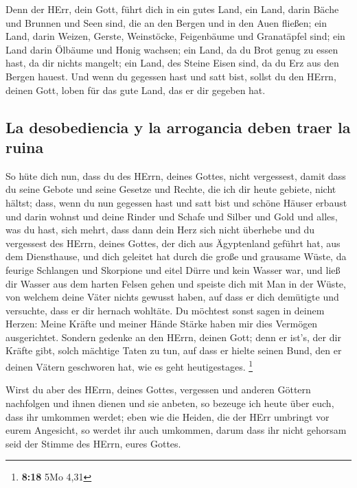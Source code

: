  Denn der HErr, dein Gott, führt dich in ein gutes Land,
ein Land, darin Bäche und Brunnen und Seen sind, die an den Bergen und
in den Auen fließen;  ein Land, darin Weizen, Gerste,
Weinstöcke, Feigenbäume und Granatäpfel sind; ein Land darin Ölbäume und
Honig wachsen;  ein Land, da du Brot genug zu essen hast,
da dir nichts mangelt; ein Land, des Steine Eisen sind, da du Erz aus
den Bergen hauest.  Und wenn du gegessen hast und satt
bist, sollst du den HErrn, deinen Gott, loben für das gute Land, das er
dir gegeben hat.

\hypertarget{la-desobediencia-y-la-arrogancia-deben-traer-la-ruina}{%
\subsection{La desobediencia y la arrogancia deben traer la
ruina}\label{la-desobediencia-y-la-arrogancia-deben-traer-la-ruina}}

 So hüte dich nun, dass du des HErrn, deines Gottes,
nicht vergessest, damit dass du seine Gebote und seine Gesetze und
Rechte, die ich dir heute gebiete, nicht hältst;  dass,
wenn du nun gegessen hast und satt bist und schöne Häuser erbaust und
darin wohnst  und deine Rinder und Schafe und Silber und
Gold und alles, was du hast, sich mehrt,  dass dann dein
Herz sich nicht überhebe und du vergessest des HErrn, deines Gottes, der
dich aus Ägyptenland geführt hat, aus dem Diensthause, 
und dich geleitet hat durch die große und grausame Wüste, da feurige
Schlangen und Skorpione und eitel Dürre und kein Wasser war, und ließ
dir Wasser aus dem harten Felsen gehen  und speiste dich
mit Man in der Wüste, von welchem deine Väter nichts gewusst haben, auf
dass er dich demütigte und versuchte, dass er dir hernach wohltäte.
 Du möchtest sonst sagen in deinem Herzen: Meine Kräfte
und meiner Hände Stärke haben mir dies Vermögen ausgerichtet.
 Sondern gedenke an den HErrn, deinen Gott; denn er
ist's, der dir Kräfte gibt, solch mächtige Taten zu tun, auf dass er
hielte seinen Bund, den er deinen Vätern geschworen hat, wie es geht
heutigestages. \footnote{\textbf{8:18} 5Mo 4,31}

 Wirst du aber des HErrn, deines Gottes, vergessen und
anderen Göttern nachfolgen und ihnen dienen und sie anbeten, so bezeuge
ich heute über euch, dass ihr umkommen werdet;  eben wie
die Heiden, die der HErr umbringt vor eurem Angesicht, so werdet ihr
auch umkommen, darum dass ihr nicht gehorsam seid der Stimme des HErrn,
eures Gottes.

